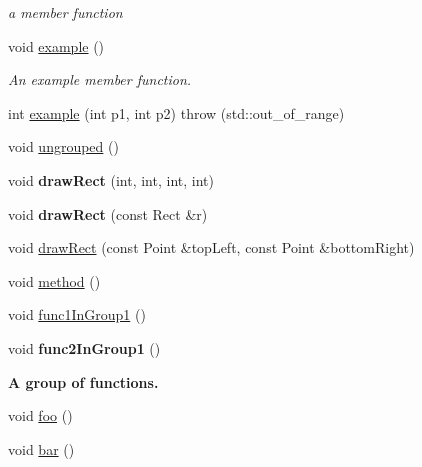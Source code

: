 \begin{DoxyCompactItemize}
\begin{DoxyCompactList}\small\item\em a member function \end{DoxyCompactList}\item 
void \hyperlink{class_test_afa2b50f4716fc3b42221a72e676e1422}{example} ()
\begin{DoxyCompactList}\small\item\em An example member function. \end{DoxyCompactList}\item 
int \hyperlink{class_test_a60df6e1ec372d0a6e12429873f87a06f}{example} (int p1, int p2)  throw (std\-::out\-\_\-of\-\_\-range)
\item 
void \hyperlink{class_test_acd63d4d5e7bb092087f3e5dfeac6bd96}{ungrouped} ()
\item 
\hypertarget{class_test_a45ad96862a0aa8ad8993a75356e3a6e2}{void {\bfseries draw\-Rect} (int, int, int, int)}\label{class_test_a45ad96862a0aa8ad8993a75356e3a6e2}

\item 
\hypertarget{class_test_ab694ef31f21b39129051d079925cc271}{void {\bfseries draw\-Rect} (const Rect \&r)}\label{class_test_ab694ef31f21b39129051d079925cc271}

\item 
void \hyperlink{class_test_a1d33d23a5f66af0843d22a021f6a1f86}{draw\-Rect} (const Point \&top\-Left, const Point \&bottom\-Right)
\item 
void \hyperlink{class_test_ab202ef3dbfe96b1fef0b45b8c6844c37}{method} ()
\end{DoxyCompactItemize}
{\bf }\par
\begin{DoxyCompactItemize}
\item 
void \hyperlink{class_test_a9a4244281b20ec21e06d07e6203b8644}{func1\-In\-Group1} ()
\item 
\hypertarget{class_test_a1c88d8c249f4fc6bf63b2f7b5b2e9130}{void {\bfseries func2\-In\-Group1} ()}\label{class_test_a1c88d8c249f4fc6bf63b2f7b5b2e9130}

\end{DoxyCompactItemize}

\begin{Indent}{\bf A group of functions.}\par
\begin{DoxyCompactItemize}
\item 
void \hyperlink{class_test_ac07863d69ae41a4e395b31f73b35fbcd}{foo} ()
\item 
void \hyperlink{class_test_a49a4b11e50430aa0a78de989ea99e082}{bar} ()
\end{DoxyCompactItemize}
\end{Indent}
